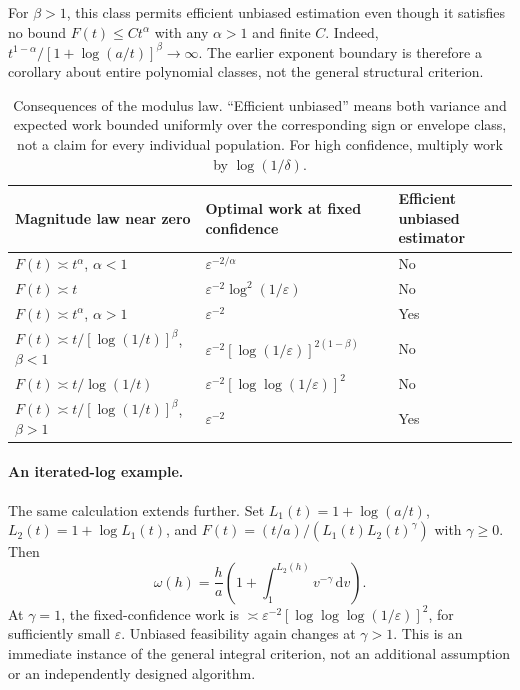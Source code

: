 \documentclass[11pt,a4paper]{article}
\theoremstyle{definition}
\begin{document}
For $\beta>1$, this class permits efficient unbiased estimation even
though it satisfies no bound $F(t)\le C t^\alpha$ with any $\alpha>1$ and
finite $C$. Indeed, $t^{1-\alpha}/[1+\log(a/t)]^\beta\to\infty$.
The earlier exponent boundary is therefore a corollary about entire
polynomial classes, not the general structural criterion.

\begin{table}[tb]
\centering\small
\begin{tabularx}{\linewidth}{@{}lXl@{}}\toprule
Magnitude law near zero & Optimal work at fixed confidence & Efficient unbiased estimator\\\midrule
$F(t)\asymp t^\alpha$, $\alpha<1$ & $\varepsilon^{-2/\alpha}$ & No\\
$F(t)\asymp t$ & $\varepsilon^{-2}\log^2(1/\varepsilon)$ & No\\
$F(t)\asymp t^\alpha$, $\alpha>1$ & $\varepsilon^{-2}$ & Yes\\
$F(t)\asymp t/[\log(1/t)]^\beta$, $\beta<1$ &
$\varepsilon^{-2}[\log(1/\varepsilon)]^{2(1-\beta)}$ & No\\
$F(t)\asymp t/\log(1/t)$ & $\varepsilon^{-2}[\log\log(1/\varepsilon)]^2$ & No\\
$F(t)\asymp t/[\log(1/t)]^\beta$, $\beta>1$ & $\varepsilon^{-2}$ & Yes\\\bottomrule
\end{tabularx}
\caption{Consequences of the modulus law. ``Efficient unbiased'' means both
variance and expected work bounded uniformly over the corresponding sign or
envelope class, not a claim for every individual population. For high
confidence, multiply work by $\log(1/\delta)$.}
\label{tab:rates}
\end{table}

\paragraph{An iterated-log example.}
The same calculation extends further. Set
$L_1(t)=1+\log(a/t)$, $L_2(t)=1+\log L_1(t)$, and
$F(t)=(t/a)/(L_1(t)L_2(t)^\gamma)$ with $\gamma\ge0$.
Then
\[
 \omega(h)=\frac ha\left(1+\int_1^{L_2(h)}v^{-\gamma}\,\mathrm dv\right).
\]
At $\gamma=1$, the fixed-confidence work is
$\asymp\varepsilon^{-2}[\log\log\log(1/\varepsilon)]^2$, for sufficiently
small $\varepsilon$. Unbiased feasibility again changes at $\gamma>1$.
This is an immediate instance of the general integral criterion, not an
additional assumption or an independently designed algorithm.
\end{document}

